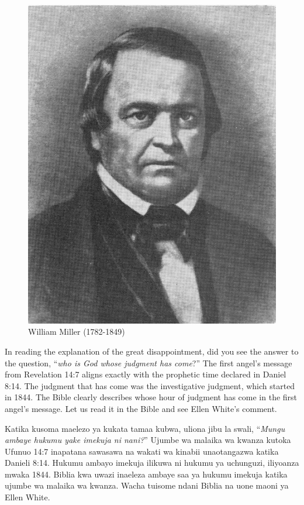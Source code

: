 \begin{figure}[hp]
    \centering
    \includegraphics[width=1\linewidth]{images/william-miller.jpg}
    \caption*{William Miller (1782-1849)}
    \label{fig:w-miller}
\end{figure}


In reading the explanation of the great disappointment, did you see the answer to the question, “\textit{who is God whose judgment has come}?” The first angel’s message from Revelation 14:7 aligns exactly with the prophetic time declared in Daniel 8:14. The judgment that has come was the investigative judgment, which started in 1844. The Bible clearly describes whose hour of judgment has come in the first angel’s message. Let us read it in the Bible and see Ellen White’s comment.


Katika kusoma maelezo ya kukata tamaa kubwa, uliona jibu la swali, “\textit{Mungu ambaye hukumu yake imekuja ni nani?}” Ujumbe wa malaika wa kwanza kutoka Ufunuo 14:7 inapatana sawasawa na wakati wa kinabii unaotangazwa katika Danieli 8:14. Hukumu ambayo imekuja ilikuwa ni hukumu ya uchunguzi, iliyoanza mwaka 1844. Biblia kwa uwazi inaeleza ambaye saa ya hukumu imekuja katika ujumbe wa malaika wa kwanza. Wacha tuisome ndani Biblia na uone maoni ya Ellen White.


